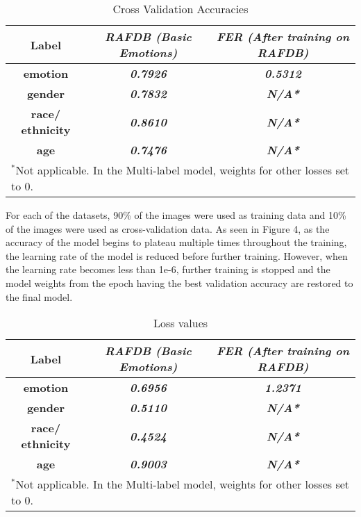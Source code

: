 \documentclass[letterpaper,10pt]{article}
\begin{document}
\begin{table}[htbp]

\begin{center}
\begin{tabular}{|c|c|c|}

\hline

\textbf{Label} & \textbf{\textit{RAFDB
 (Basic Emotions)}}& \textbf{\textit{FER (After training on RAFDB)}} \\
\hline
\textbf{emotion} & \textbf{\textit{0.7926}}& \textbf{\textit{0.5312}} \\
\hline
\textbf{gender} & \textbf{\textit{0.7832}}& \textbf{\textit{N/A*}} \\
\hline
\textbf{race/ ethnicity} & \textbf{\textit{0.8610 }}& \textbf{\textit{N/A*}} \\
\hline
\textbf{age} & \textbf{\textit{0.7476 }}& \textbf{\textit{N/A*}} \\
\hline
\multicolumn{3}{l}{$^{\mathrm{*}}$Not applicable. In the Multi-label model, weights for other losses set to 0.
}

\end{tabular}
\label{tab1}
\end{center}
\caption{Cross Validation Accuracies}
\end{table}
For each of the datasets, 90\% of the images were used as training data and 10\% of the images were used as cross-validation data. As seen in Figure 4, as the accuracy of the model begins to plateau multiple times throughout the training, the learning rate of the model is reduced before further training. However, when the learning rate becomes less than 1e-6, further training is stopped and the model weights from the epoch having the best validation accuracy are restored to the final model.
\begin{table}[htbp]

\begin{center}
\begin{tabular}{|c|c|c|}

\hline

\textbf{Label} & \textbf{\textit{RAFDB
 (Basic Emotions)}}& \textbf{\textit{FER (After training on RAFDB)}} \\
\hline
\textbf{emotion} & \textbf{\textit{0.6956}}& \textbf{\textit{1.2371}} \\
\hline
\textbf{gender} & \textbf{\textit{0.5110}}& \textbf{\textit{N/A*}} \\
\hline
\textbf{race/ ethnicity} & \textbf{\textit{0.4524}}& \textbf{\textit{N/A*}} \\
\hline
\textbf{age} & \textbf{\textit{0.9003}}& \textbf{\textit{N/A*}} \\
\hline
\multicolumn{3}{l}{$^{\mathrm{*}}$Not applicable. In the Multi-label model, weights for other losses set to 0.
}

\end{tabular}
\label{tab1e}
\end{center}
\caption{Loss values}
\end{table}
\end{document}
